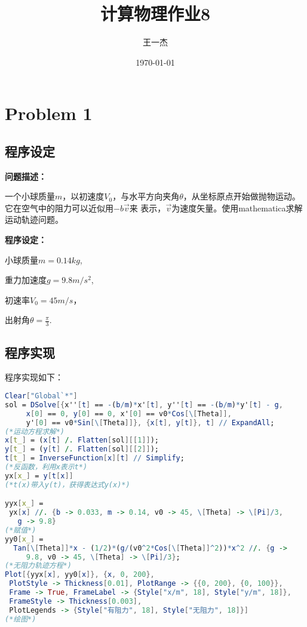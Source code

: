 \documentclass{article}
\title{计算物理作业8} %
\author[a]{王一杰} %
\affil[a]{中国科学技术大学}
\date{\today}%
\begin{document}
\maketitle
\tableofcontents

\section{Problem 1}
\subsection{程序设定}
\textbf{问题描述：}

一个小球质量$m$，以初速度$V_0$，与水平方向夹角$\theta$，从坐标原点开始做抛物运动。它在空气中的阻力可以近似用$-b\overrightarrow{v}$来 表示，$\overrightarrow{v}$为速度矢量。使用mathematica求解运动轨迹问题。

\textbf{程序设定：}

\quad 小球质量$m=0.14kg$,

\quad 重力加速度$g=9.8m/s^2$,

\quad 初速率$V_0=45m/s$，

\quad 出射角$\theta=\frac{\pi}{3}$.

\subsection{程序实现}

程序实现如下：

\begin{lstlisting}[language=Mathematica]
Clear["Global`*"]
sol = DSolve[{x''[t] == -(b/m)*x'[t], y''[t] == -(b/m)*y'[t] - g, 
     x[0] == 0, y[0] == 0, x'[0] == v0*Cos[\[Theta]], 
     y'[0] == v0*Sin[\[Theta]]}, {x[t], y[t]}, t] // ExpandAll;
(*运动方程求解*)
x[t_] = (x[t] /. Flatten[sol][[1]]);
y[t_] = (y[t] /. Flatten[sol][[2]]);
t[t_] = InverseFunction[x][t] // Simplify;
(*反函数，利用x表示t*)
yx[x_] = y[t[x]]
(*t(x)带入y(t)，获得表达式y(x)*)

yyx[x_] = 
 yx[x] //. {b -> 0.033, m -> 0.14, v0 -> 45, \[Theta] -> \[Pi]/3, 
   g -> 9.8}
(*赋值*)
yy0[x_] = 
  Tan[\[Theta]]*x - (1/2)*(g/(v0^2*Cos[\[Theta]]^2))*x^2 //. {g -> 
     9.8, v0 -> 45, \[Theta] -> \[Pi]/3};
(*无阻力轨迹方程*)
Plot[{yyx[x], yy0[x]}, {x, 0, 200}, 
 PlotStyle -> Thickness[0.01], PlotRange -> {{0, 200}, {0, 100}}, 
 Frame -> True, FrameLabel -> {Style["x/m", 18], Style["y/m", 18]}, 
 FrameStyle -> Thickness[0.003], 
 PlotLegends -> {Style["有阻力", 18], Style["无阻力", 18]}]
(*绘图*)
\end{lstlisting}
\end{document}
